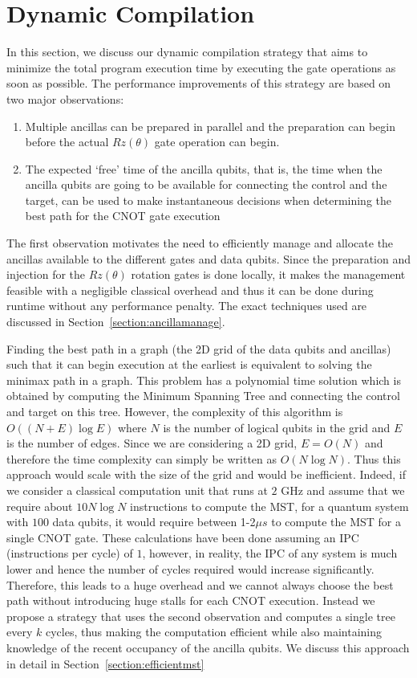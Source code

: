 \section{Dynamic Compilation}
In this section, we discuss our dynamic compilation strategy that aims to minimize the total program execution time by executing the gate operations as soon as possible. The performance improvements of this strategy are based on two major observations:
\begin{enumerate}
    \item Multiple ancillas can be prepared in parallel and the preparation can begin before the actual $Rz(\theta)$ gate operation can begin.
    \item The expected `free' time of the ancilla qubits, that is, the time when the ancilla qubits are going to be available for connecting the control and the target, can be used to make instantaneous decisions when determining the best path for the CNOT gate execution
\end{enumerate}
The first observation motivates the need to efficiently manage and allocate the ancillas available to the different gates and data qubits. Since the preparation and injection for the $Rz(\theta)$ rotation gates is done locally, it makes the management feasible with a negligible classical overhead and thus it can be done during runtime without any performance penalty. The exact techniques used are discussed in Section~\ref{section:ancillamanage}.\par
Finding the best path in a graph (the 2D grid of the data qubits and ancillas) such that it can begin execution at the earliest is equivalent to solving the minimax path in a graph. This problem has a polynomial time solution which is obtained by computing the Minimum Spanning Tree and connecting the control and target on this tree. However, the complexity of this algorithm is $O((N + E)\log{E})$ where $N$ is the number of logical qubits in the grid and $E$ is the number of edges. Since we are considering a 2D grid, $E = O(N)$ and therefore the time complexity can simply be written as $O(N\log{N})$. Thus this approach would scale with the size of the grid and would be inefficient. Indeed, if we consider a classical computation unit that runs at $2$ GHz and assume that we require about $10N\log{N}$ instructions to compute the MST, for a quantum system with $100$ data qubits, it would require between 1-2$\mu s$ to compute the MST for a single CNOT gate. These calculations have been done assuming an IPC (instructions per cycle) of $1$, however, in reality, the IPC of any system is much lower and hence the number of cycles required would increase significantly. Therefore, this leads to a huge overhead and we cannot always choose the best path without introducing huge stalls for each CNOT execution. Instead we propose a strategy that uses the second observation and computes a single tree every $k$ cycles, thus making the computation efficient while also maintaining knowledge of the recent occupancy of the ancilla qubits. We discuss this approach in detail in Section~\ref{section:efficientmst}

